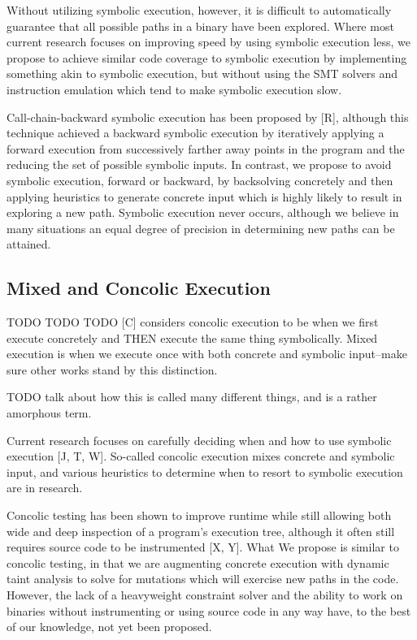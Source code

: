 \documentclass[11pt,expanded,copyright]{fsuthesis}
\begin{document}
Without utilizing symbolic execution, however, it is difficult to automatically guarantee that all possible paths in a binary have been explored. Where most current research focuses on improving speed by using symbolic execution less, we propose to achieve similar code coverage to symbolic execution by implementing something akin to symbolic execution, but without using the SMT solvers and instruction emulation which tend to make symbolic execution slow.

Call-chain-backward symbolic execution has been proposed by [R], although this technique achieved a backward symbolic execution by iteratively applying a forward execution from successively farther away points in the program and the reducing the set of possible symbolic inputs. In contrast, we propose to avoid symbolic execution, forward or backward, by backsolving concretely and then applying heuristics to generate concrete input which is highly likely to result in exploring a new path. Symbolic execution never occurs, although we believe in many situations an equal degree of precision in determining new paths can be attained.

\subsection{Mixed and Concolic Execution}

TODO TODO TODO [C] considers concolic execution to be when we first execute concretely and THEN execute the same thing symbolically. Mixed execution is when we execute once with both concrete and symbolic input--make sure other works stand by this distinction.

TODO talk about how this is called many different things, and is a rather amorphous term.

Current research focuses on carefully deciding when and how to use symbolic execution [J, T, W]. So-called concolic execution mixes concrete and symbolic input, and various heuristics to determine when to resort to symbolic execution are in research.

Concolic testing has been shown to improve runtime while still allowing both wide and deep inspection of a program's execution tree, although it often still requires source code to be instrumented [X, Y]. What We propose is similar to concolic testing, in that we are augmenting concrete execution with dynamic taint analysis to solve for mutations which will exercise new paths in the code. However, the lack of a heavyweight constraint solver and the ability to work on binaries without instrumenting or using source code in any way have, to the best of our knowledge, not yet been proposed.
\end{document}
